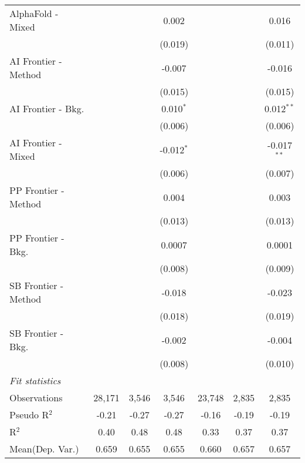 \begin{tabular}{lcccccc}
   AlphaFold - Mixed    &              &              & 0.002        &                &              & 0.016\\   
                        &              &              & (0.019)      &                &              & (0.011)\\   
   AI Frontier - Method &              &              & -0.007       &                &              & -0.016\\   
                        &              &              & (0.015)      &                &              & (0.015)\\   
   AI Frontier - Bkg.   &              &              & 0.010$^{*}$  &                &              & 0.012$^{**}$\\   
                        &              &              & (0.006)      &                &              & (0.006)\\   
   AI Frontier - Mixed  &              &              & -0.012$^{*}$ &                &              & -0.017$^{**}$\\   
                        &              &              & (0.006)      &                &              & (0.007)\\   
   PP Frontier - Method &              &              & 0.004        &                &              & 0.003\\   
                        &              &              & (0.013)      &                &              & (0.013)\\   
   PP Frontier - Bkg.   &              &              & 0.0007       &                &              & 0.0001\\   
                        &              &              & (0.008)      &                &              & (0.009)\\   
   SB Frontier - Method &              &              & -0.018       &                &              & -0.023\\   
                        &              &              & (0.018)      &                &              & (0.019)\\   
   SB Frontier - Bkg.   &              &              & -0.002       &                &              & -0.004\\   
                        &              &              & (0.008)      &                &              & (0.010)\\   
   \midrule
   \emph{Fit statistics}\\
   Observations         & 28,171       & 3,546        & 3,546        & 23,748         & 2,835        & 2,835\\  
   Pseudo R$^2$         & -0.21        & -0.27        & -0.27        & -0.16          & -0.19        & -0.19\\  
   R$^2$                & 0.40         & 0.48         & 0.48         & 0.33           & 0.37         & 0.37\\  
Mean(Dep. Var.) & 0.659 & 0.655 & 0.655 & 0.660 & 0.657 & 0.657 \\
   

\end{tabular}
